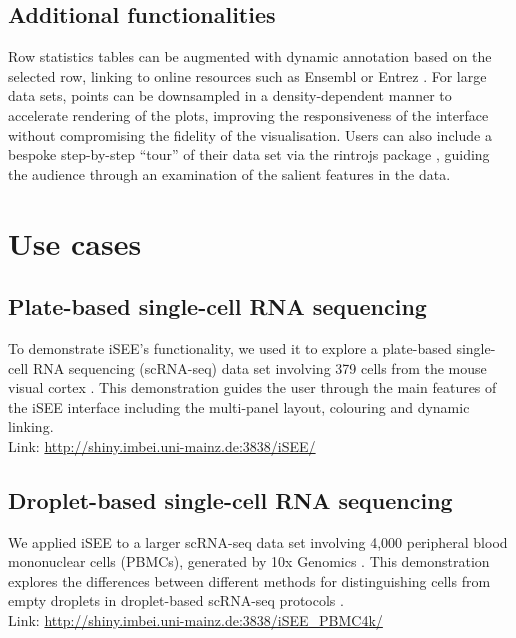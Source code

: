 \documentclass[10pt,a4paper,twocolumn]{article}
\let\cite\citep
\begin{document}
\subsection*{Additional functionalities}
Row statistics tables can be augmented with dynamic annotation based on the selected row, linking to online resources such as Ensembl \citep{zerbino2018ensembl} or Entrez \citep{ncbi2017entrez}. %
For large data sets, points can be downsampled in a density-dependent manner to accelerate rendering of the plots, improving the responsiveness of the interface without compromising the fidelity of the visualisation.
Users can also include a bespoke step-by-step ``tour'' of their data set via the rintrojs package \cite{ganz2016rintrojs}, guiding the audience through an examination of the salient features in the data.

\section*{Use cases} %

\subsection*{Plate-based single-cell RNA sequencing}
To demonstrate iSEE's functionality, we used it to explore a plate-based single-cell RNA sequencing (scRNA-seq) data set involving 379 cells from the mouse visual cortex \citep{tasic2016allen}.
This demonstration guides the user through the main features of the iSEE interface including the multi-panel layout, colouring and dynamic linking.\\

Link: \url{http://shiny.imbei.uni-mainz.de:3838/iSEE/}

\subsection*{Droplet-based single-cell RNA sequencing}
We applied iSEE to a larger scRNA-seq data set involving 4,000 peripheral blood mononuclear cells (PBMCs), generated by 10x Genomics \citep{zheng2017massively}.
This demonstration explores the differences between different methods for distinguishing cells from empty droplets in droplet-based scRNA-seq protocols \citep{lun2018distinguishing}.\\

Link: \url{http://shiny.imbei.uni-mainz.de:3838/iSEE_PBMC4k/}
\end{document}
